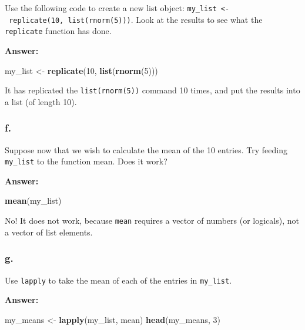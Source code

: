 \documentclass[]{article}
\newenvironment{Shaded}{\begin{snugshade}}{\end{snugshade}}
\newcommand{\DecValTok}[1]{\textcolor[rgb]{0.00,0.00,0.81}{#1}}
\newcommand{\KeywordTok}[1]{\textcolor[rgb]{0.13,0.29,0.53}{\textbf{#1}}}
\newcommand{\NormalTok}[1]{#1}
\newcommand{\StringTok}[1]{\textcolor[rgb]{0.31,0.60,0.02}{#1}}
\begin{document}
Use the following code to create a new list object:
\texttt{my\_list\ \textless{}-\ replicate(10,\ list(rnorm(5)))}. Look at
the results to see what the \texttt{replicate} function has done.

\textbf{Answer:}

\begin{Shaded}
\begin{Highlighting}[]
\NormalTok{my_list <-}\StringTok{ }\KeywordTok{replicate}\NormalTok{(}\DecValTok{10}\NormalTok{, }\KeywordTok{list}\NormalTok{(}\KeywordTok{rnorm}\NormalTok{(}\DecValTok{5}\NormalTok{)))}
\end{Highlighting}
\end{Shaded}

It has replicated the \texttt{list(rnorm(5))} command 10 times, and put
the results into a list (of length 10).

\hypertarget{f.-1}{%
\subsubsection{f.}\label{f.-1}}

Suppose now that we wish to calculate the mean of the 10 entries. Try
feeding \texttt{my\_list} to the function mean. Does it work?

\textbf{Answer:}

\begin{Shaded}
\begin{Highlighting}[]
\KeywordTok{mean}\NormalTok{(my_list)}
\end{Highlighting}
\end{Shaded}

No! It does not work, because \texttt{mean} requires a vector of numbers
(or logicals), not a vector of list elements.

\hypertarget{g.}{%
\subsubsection{g.}\label{g.}}

Use \texttt{lapply} to take the mean of each of the entries in
\texttt{my\_list}.

\textbf{Answer:}

\begin{Shaded}
\begin{Highlighting}[]
\NormalTok{my_means <-}\StringTok{ }\KeywordTok{lapply}\NormalTok{(my_list, mean)}
\KeywordTok{head}\NormalTok{(my_means, }\DecValTok{3}\NormalTok{)}
\end{Highlighting}
\end{Shaded}
\end{document}
